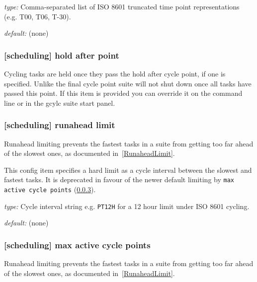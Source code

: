 \begin{myitemize}
    \item {\em type:} Comma-separated list of ISO 8601 truncated time point
        representations (e.g. T00, T06, T-30).
    \item {\em default:} (none)
\end{myitemize}

\subsubsection[hold after point]{[scheduling] \textrightarrow hold after point}

Cycling tasks are held once they pass the hold after cycle point, if one is
specified. Unlike the final cycle point suite will not shut down once all tasks
have passed this point. If this item is provided you can override it on the
command line or in the gcylc suite start panel.

\subsubsection[runahead limit]{[scheduling] \textrightarrow runahead limit}
\label{runahead limit}

Runahead limiting prevents the fastest tasks in a suite from getting too far
ahead of the slowest ones, as documented in~\ref{RunaheadLimit}.

This config item specifies a hard limit as a cycle interval between the
slowest and fastest tasks. It is deprecated in favour of the newer default
limiting by \lstinline=max active cycle points= (\ref{max active cycle points}).

\begin{myitemize}
    \item {\em type:} Cycle interval string e.g. \lstinline=PT12H=
    for a 12 hour limit under ISO 8601 cycling.
    \item {\em default:} (none)
\end{myitemize}

\subsubsection[max active cycle points]{[scheduling] \textrightarrow
 max active cycle points}
\label{max active cycle points}

Runahead limiting prevents the fastest tasks in a suite from getting too far
ahead of the slowest ones, as documented in~\ref{RunaheadLimit}.

